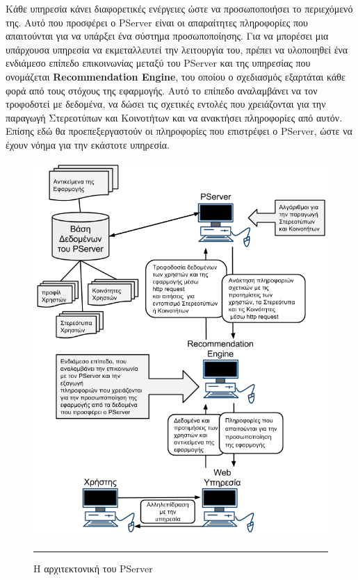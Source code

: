 Κάθε υπηρεσία κάνει διαφορετικές ενέργειες ώστε να προσωποποιήσει το περιεχόμενό της. 
Αυτό που προσφέρει ο PServer είναι οι απαραίτητες πληροφορίες που απαιτούνται για να υπάρξει ένα σύστημα προσωποποίησης. 
Για να μπορέσει μια υπάρχουσα υπηρεσία να εκμεταλλευτεί την λειτουργία του, 
πρέπει να υλοποιηθεί ένα ενδιάμεσο επίπεδο επικοινωνίας μεταξύ του PServer και της υπηρεσίας που ονομάζεται \textbf{Recommendation Engine},
του οποίου ο σχεδιασμός εξαρτάται κάθε φορά από τους στόχους της εφαρμογής.
Αυτό το επίπεδο αναλαμβάνει να τον τροφοδοτεί με δεδομένα, να δώσει τις σχετικές εντολές που χρειάζονται για την παραγωγή Στερεοτύπων και Κοινοτήτων 
και να ανακτήσει πληροφορίες από αυτόν. Επίσης εδώ θα προεπεξεργαστούν οι πληροφορίες που επιστρέφει ο PServer, ώστε να έχουν νόημα για την εκάστοτε υπηρεσία.


\begin{figure}[htbp]
  \hspace{-3.5em}  
    \includegraphics[scale=0.75]{Figures/PServerArchitecture.png}
	\rule{35em}{0.5pt}  %
	\caption[PServerArchitecture]{Η αρχιτεκτονική του PServer}
  \label{fig:PServerArchitecture}  
\end{figure}


